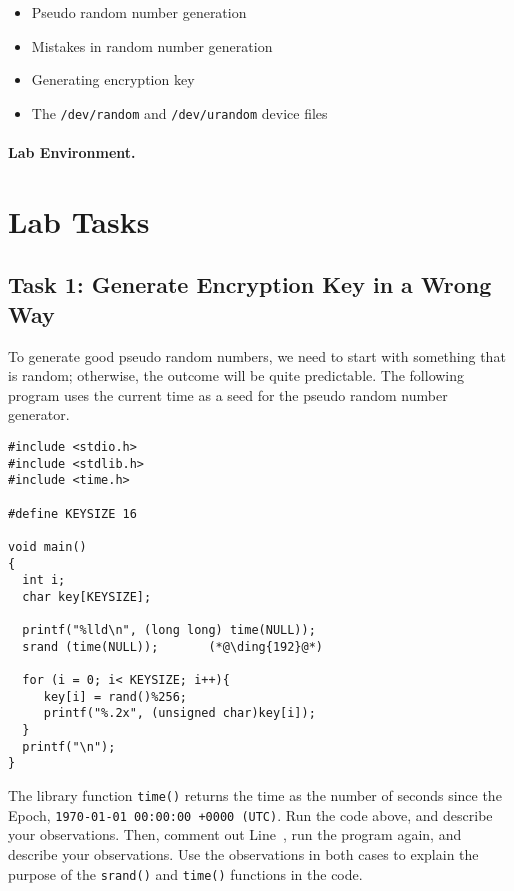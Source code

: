 \begin{itemize}[noitemsep]
\item Pseudo random number generation
\item Mistakes in random number generation
\item Generating encryption key
\item The \texttt{/dev/random} and \texttt{/dev/urandom} device files  
\end{itemize}


\paragraph{Lab Environment.} \seedenvironment


\section{Lab Tasks}



\subsection{Task 1: Generate Encryption Key in a Wrong Way}

To generate good pseudo random numbers, we need to start with something
that is random; otherwise, the outcome will be quite predictable. 
The following program uses the current time as a seed for the 
pseudo random number generator.


\begin{lstlisting}[caption="Generating a 128-bit encryption key", label=enc:code:key_gen]
#include <stdio.h>
#include <stdlib.h>
#include <time.h>

#define KEYSIZE 16

void main()
{
  int i;
  char key[KEYSIZE];

  printf("%lld\n", (long long) time(NULL));
  srand (time(NULL));       (*@\ding{192}@*)

  for (i = 0; i< KEYSIZE; i++){
     key[i] = rand()%256;
     printf("%.2x", (unsigned char)key[i]);
  }
  printf("\n");
}
\end{lstlisting}
 

The library function \texttt{time()} returns the time as the number of seconds since the Epoch,
\texttt{1970-01-01 00:00:00 +0000 (UTC)}. Run the code above, and describe your
observations. Then, comment out Line~, run the program again, and describe your
observations. Use the observations in both cases to explain the purpose of 
the \texttt{srand()} and \texttt{time()} functions in the code. 




